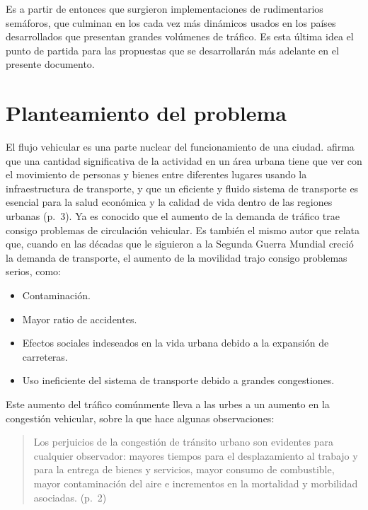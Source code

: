 Es a partir de entonces que surgieron implementaciones de rudimentarios
semáforos, que culminan en los cada vez más dinámicos usados en los
países desarrollados que presentan grandes volúmenes de tráfico. Es esta
última idea el punto de partida para las propuestas que se desarrollarán
más adelante en el presente documento.

\hypertarget{planteamiento-del-problema}{%
\section{Planteamiento del problema}\label{planteamiento-del-problema}}

El flujo vehicular es una parte nuclear del funcionamiento de una
ciudad. \textcite{Patriksson2012} afirma que una cantidad significativa
de la actividad en un área urbana tiene que ver con el movimiento de
personas y bienes entre diferentes lugares usando la infraestructura de
transporte, y que un eficiente y fluido sistema de transporte es
esencial para la salud económica y la calidad de vida dentro de las
regiones urbanas (p.~3). Ya es conocido que el aumento de la demanda de
tráfico trae consigo problemas de circulación vehicular. Es también el
mismo autor que relata que, cuando en las décadas que le siguieron a la
Segunda Guerra Mundial creció la demanda de transporte, el aumento de la
movilidad trajo consigo problemas serios, como:

\begin{itemize}
\item
  Contaminación.
\item
  Mayor ratio de accidentes.
\item
  Efectos sociales indeseados en la vida urbana debido a la expansión de
  carreteras.
\item
  Uso ineficiente del sistema de transporte debido a grandes
  congestiones.
\end{itemize}

Este aumento del tráfico comúnmente lleva a las urbes a un aumento en la
congestión vehicular, sobre la que \textcite{Medina-Durango2011} hace
algunas observaciones:

\begin{quote}
Los perjuicios de la congestión de tránsito urbano son evidentes para
cualquier observador: mayores tiempos para el desplazamiento al trabajo
y para la entrega de bienes y servicios, mayor consumo de combustible,
mayor contaminación del aire e incrementos en la mortalidad y morbilidad
asociadas. (p.~2)
\end{quote}

